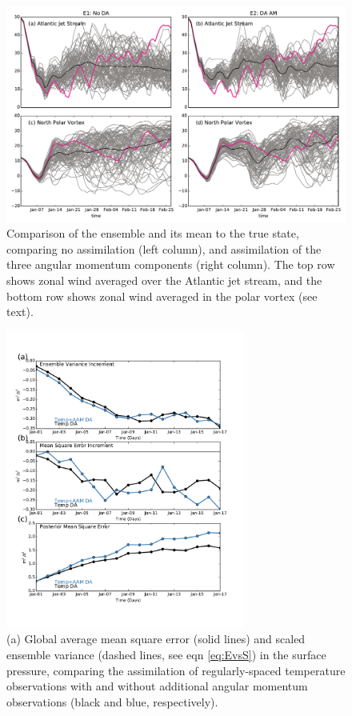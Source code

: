  \begin{figure}
	 \includegraphics[width=\textwidth]{Paper_figures/ERPDA_paper_point_checks.pdf}
	 \caption{Comparison of the ensemble and its mean to the true state, comparing no assimilation (left column), and assimilation of the three angular momentum components (right column). The top row shows zonal wind averaged over the Atlantic jet stream, and the bottom row shows zonal wind averaged in the polar vortex (see text).}
	 \label{fig:point_checks}
\end{figure}


 \begin{figure}
	 \includegraphics[width=0.7\textwidth]{Paper_figures/ERPDA_paper_MSE_RST_vs_ERPRST_global.pdf}
	 \caption{(a) Global average mean square error (solid lines) and scaled ensemble variance (dashed lines, see eqn \ref{eq:EvsS}) in the surface pressure, comparing the assimilation of regularly-spaced temperature observations with and without additional angular momentum observations (black and blue, respectively).}
	 \label{fig:added_value_MSE}
\end{figure}

